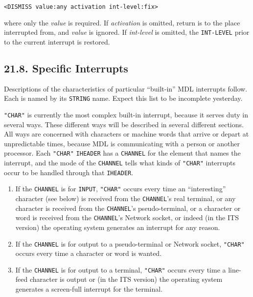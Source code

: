 \documentclass[a4paper,]{article}
\providecommand{\tightlist}{%
  \setlength{\itemsep}{0pt}\setlength{\parskip}{0pt}}
\begin{document}
\begin{verbatim}
<DISMISS value:any activation int-level:fix>
\end{verbatim}

where only the \emph{value} is required. If \emph{activation} is omitted, return is to the place interrupted from, and
\emph{value} is ignored. If \emph{int-level} is omitted, the \texttt{INT-LEVEL} prior to the current interrupt is restored.

\subsection{21.8. Specific Interrupts}\label{specific-interrupts}

 Descriptions of the characteristics of particular ``built-in'' MDL interrupts follow. Each
is named by its \texttt{STRING} name. Expect this list to be incomplete yesterday.

\texttt{"CHAR"} is currently the most complex built-in interrupt, because it serves duty in several ways. These different
ways will be described in several different sections. All ways are concerned with characters or machine words that arrive
or depart at unpredictable times, because MDL is communicating with a person or another processor. Each \texttt{"CHAR"}
\texttt{IHEADER} has a \texttt{CHANNEL} for the element that names the interrupt, and the mode of the \texttt{CHANNEL}
tells what kinds of \texttt{"CHAR"} interrupts occur to be handled through that \texttt{IHEADER}.

\begin{enumerate}
\def\labelenumi{\arabic{enumi}.}
\tightlist
\item
  If the \texttt{CHANNEL} is for \texttt{INPUT}, \texttt{"CHAR"} occurs every time an ``interesting'' character (see below)
  is received from the \texttt{CHANNEL}'s real terminal, or any character is received from the \texttt{CHANNEL}'s
  pseudo-terminal, or a character or word is received from the \texttt{CHANNEL}'s Network socket, or indeed (in the
  ITS version) the operating system generates an interrupt for any reason.
\item
  If the \texttt{CHANNEL} is for output to a pseudo-terminal or Network socket, \texttt{"CHAR"} occurs every time a
  character or word is wanted.
\item
  If the \texttt{CHANNEL} is for output to a terminal, \texttt{"CHAR"} occurs every time a line-feed character is output or
  (in the ITS version) the operating system generates a screen-full interrupt for the terminal.
\end{enumerate}
\end{document}
